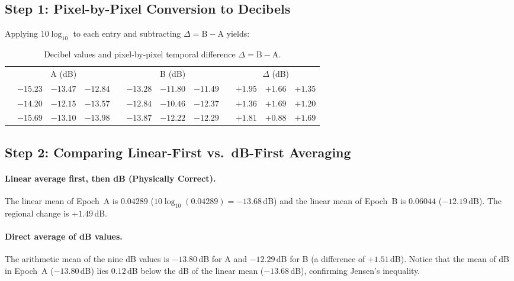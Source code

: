 \documentclass[11pt,a4paper]{article}
\begin{document}
\subsection{Step 1: Pixel-by-Pixel Conversion to Decibels}

Applying $10\log_{10}$ to each entry and subtracting $\Delta = \mathrm{B} - \mathrm{A}$ yields:

\begin{table}[htbp]
\centering
\caption{Decibel values and pixel-by-pixel temporal difference $\Delta=\mathrm{B}-\mathrm{A}$.}
\label{tab:mano-db}
\small
\begin{tabular}{@{}c ccc c ccc c ccc@{}}
\toprule
 & \multicolumn{3}{c}{A (dB)} & & \multicolumn{3}{c}{B (dB)} & & \multicolumn{3}{c}{$\Delta$ (dB)} \\
\cmidrule(lr){2-4}\cmidrule(lr){6-8}\cmidrule(lr){10-12}
 & $-15.23$ & $-13.47$ & $-12.84$ & & $-13.28$ & $-11.80$ & $-11.49$ & & $+1.95$ & $+1.66$ & $+1.35$ \\
 & $-14.20$ & $-12.15$ & $-13.57$ & & $-12.84$ & $-10.46$ & $-12.37$ & & $+1.36$ & $+1.69$ & $+1.20$ \\
 & $-15.69$ & $-13.10$ & $-13.98$ & & $-13.87$ & $-12.22$ & $-12.29$ & & $+1.81$ & $+0.88$ & $+1.69$ \\
\bottomrule
\end{tabular}
\end{table}

\subsection{Step 2: Comparing Linear-First vs.\ dB-First Averaging}

\paragraph{Linear average first, then dB (Physically Correct).} The linear mean of Epoch~A is $0.04289$ ($10\log_{10}(0.04289) = -13.68$\,dB) and the linear mean of Epoch~B is $0.06044$ ($-12.19$\,dB). The regional change is $+1.49$\,dB.

\paragraph{Direct average of dB values.} The arithmetic mean of the nine dB values is $-13.80$\,dB for A and $-12.29$\,dB for B (a difference of $+1.51$\,dB). Notice that the mean of dB in Epoch~A ($-13.80$\,dB) lies $0.12$\,dB below the dB of the linear mean ($-13.68$\,dB), confirming Jensen's inequality.
\end{document}

